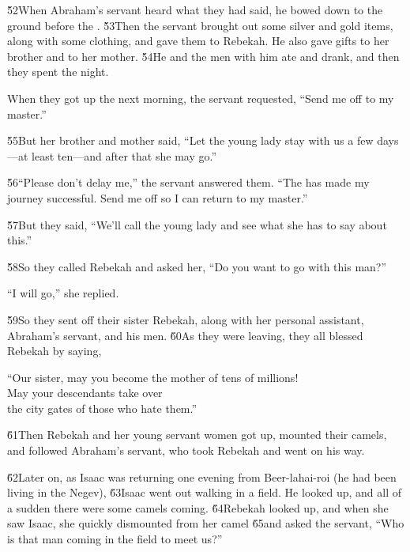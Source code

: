 \v{52}When Abraham's servant heard what they had said, he bowed down to the ground before the . \v{53}Then the servant brought out some silver and gold items, along with some clothing, and gave them to Rebekah. He also gave gifts to her brother and to her mother. \v{54}He and the men with him ate and drank, and then they spent the night.

When they got up the next morning, the servant requested, ``Send me off to my master.''

\v{55}But her brother and mother said, ``Let the young lady stay with us a few days---at least ten---and after that she may go.''

\v{56}``Please don't delay me,'' the servant answered them. ``The  has made my journey successful. Send me off so I can return to my master.''

\v{57}But they said, ``We'll call the young lady and see what she has to say about this.''

\v{58}So they called Rebekah and asked her, ``Do you want to go with this man?''

``I will go,'' she replied.

\v{59}So they sent off their sister Rebekah, along with her personal assistant, Abraham's servant, and his men. \v{60}As they were leaving, they all blessed Rebekah by saying,

\begin{poetry}
\poeml ``Our sister, may you become the mother of tens of millions! \\
\poemll    May your descendants take over \\
\poemlll       the city gates of those who hate them.''
\end{poetry}

\v{61}Then Rebekah and her young servant women got up, mounted their camels, and followed Abraham's servant, who took Rebekah and went on his way.

\v{62}Later on, as Isaac was returning one evening from Beer-lahai-roi (he had been living in the Negev), \v{63}Isaac went out walking in a field. He looked up, and all of a sudden there were some camels coming. \v{64}Rebekah looked up, and when she saw Isaac, she quickly dismounted from her camel \v{65}and asked the servant, ``Who is that man coming in the field to meet us?''

